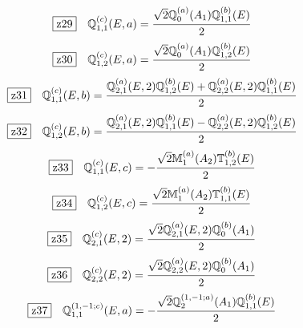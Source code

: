 \documentclass[fleqn,10pt,landscape]{jsarticle}
\begin{document}
\begin{dmath*}
\hspace*{3mm}\fbox{z29}\quad \mathbb{Q}_{1,1}^{(c)}(E,a)=\frac{\sqrt{2} \mathbb{Q}_{0}^{(a)}(A_{1}) \mathbb{Q}_{1,1}^{(b)}(E)}{2}
\end{dmath*}
\begin{dmath*}
\hspace*{3mm}\fbox{z30}\quad \mathbb{Q}_{1,2}^{(c)}(E,a)=\frac{\sqrt{2} \mathbb{Q}_{0}^{(a)}(A_{1}) \mathbb{Q}_{1,2}^{(b)}(E)}{2}
\end{dmath*}
\begin{dmath*}
\hspace*{3mm}\fbox{z31}\quad \mathbb{Q}_{1,1}^{(c)}(E,b)=\frac{\mathbb{Q}_{2,1}^{(a)}(E,2) \mathbb{Q}_{1,2}^{(b)}(E) + \mathbb{Q}_{2,2}^{(a)}(E,2) \mathbb{Q}_{1,1}^{(b)}(E)}{2}
\end{dmath*}
\begin{dmath*}
\hspace*{3mm}\fbox{z32}\quad \mathbb{Q}_{1,2}^{(c)}(E,b)=\frac{\mathbb{Q}_{2,1}^{(a)}(E,2) \mathbb{Q}_{1,1}^{(b)}(E) - \mathbb{Q}_{2,2}^{(a)}(E,2) \mathbb{Q}_{1,2}^{(b)}(E)}{2}
\end{dmath*}
\begin{dmath*}
\hspace*{3mm}\fbox{z33}\quad \mathbb{Q}_{1,1}^{(c)}(E,c)=- \frac{\sqrt{2} \mathbb{M}_{1}^{(a)}(A_{2}) \mathbb{T}_{1,2}^{(b)}(E)}{2}
\end{dmath*}
\begin{dmath*}
\hspace*{3mm}\fbox{z34}\quad \mathbb{Q}_{1,2}^{(c)}(E,c)=\frac{\sqrt{2} \mathbb{M}_{1}^{(a)}(A_{2}) \mathbb{T}_{1,1}^{(b)}(E)}{2}
\end{dmath*}
\begin{dmath*}
\hspace*{3mm}\fbox{z35}\quad \mathbb{Q}_{2,1}^{(c)}(E,2)=\frac{\sqrt{2} \mathbb{Q}_{2,1}^{(a)}(E,2) \mathbb{Q}_{0}^{(b)}(A_{1})}{2}
\end{dmath*}
\begin{dmath*}
\hspace*{3mm}\fbox{z36}\quad \mathbb{Q}_{2,2}^{(c)}(E,2)=\frac{\sqrt{2} \mathbb{Q}_{2,2}^{(a)}(E,2) \mathbb{Q}_{0}^{(b)}(A_{1})}{2}
\end{dmath*}
\begin{dmath*}
\hspace*{3mm}\fbox{z37}\quad \mathbb{Q}_{1,1}^{(1,-1;c)}(E,a)=- \frac{\sqrt{2} \mathbb{Q}_{2}^{(1,-1;a)}(A_{1}) \mathbb{Q}_{1,1}^{(b)}(E)}{2}
\end{dmath*}
\end{document}
